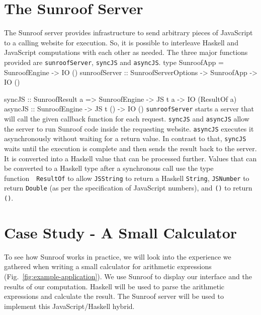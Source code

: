 \documentclass{llncs}
\newcommand{\Src}[1]{{\tt{#1}}}
\newenvironment{Code}{\verbatim}{\endverbatim}
\newcommand{\FigRef}[1]{Fig.~\ref{#1}}
\begin{document}
\section{The Sunroof Server}
\label{sec:server}

The Sunroof server provides infrastructure to send arbitrary pieces 
of JavaScript to a calling website for execution. 
So, it is possible to interleave Haskell and JavaScript 
computations with each other as needed. The three major functions
provided are \Src{sunroofServer}, \Src{syncJS} and \Src{asyncJS}.
\begin{Code}
type SunroofApp = SunroofEngine -> IO ()
sunroofServer :: SunroofServerOptions -> SunroofApp -> IO ()

syncJS  :: SunroofResult a 
        => SunroofEngine -> JS t a -> IO (ResultOf a)
asyncJS :: SunroofEngine -> JS t () -> IO ()
\end{Code}
\Src{sunroofServer} starts a server that will call the given callback function
for each request.
\Src{syncJS} and \Src{asyncJS} allow the server
to run Sunroof code inside the requesting website.
\Src{asyncJS} executes it asynchronously without 
waiting for a return value. In contrast to that, 
\Src{syncJS} waits until the execution is complete and
then sends the result back to the server. It
is converted into a Haskell value that can be processed further. 
Values that can be converted to a Haskell type after a synchronous
call use the type function~\cite{..}~\Src{ResultOf} to
allow \Src{JSString} to return a Haskell \Src{String}, 
\Src{JSNumber} to return \Src{Double} (as per the specification
of JavaScript numbers), and \Src{()} to return \Src{()}.

\section{Case Study - A Small Calculator}
\label{sec:extended-example}

To see how Sunroof works in practice, we will look into the 
experience we gathered when writing a small calculator
for arithmetic expressions (\FigRef{fig:example-application}). 
We use Sunroof to display our interface
and the results of our computation. Haskell will be used to parse the 
arithmetic expressions and calculate the result. The Sunroof server 
will be used to implement this JavaScript/Haskell hybrid.
\end{document}
